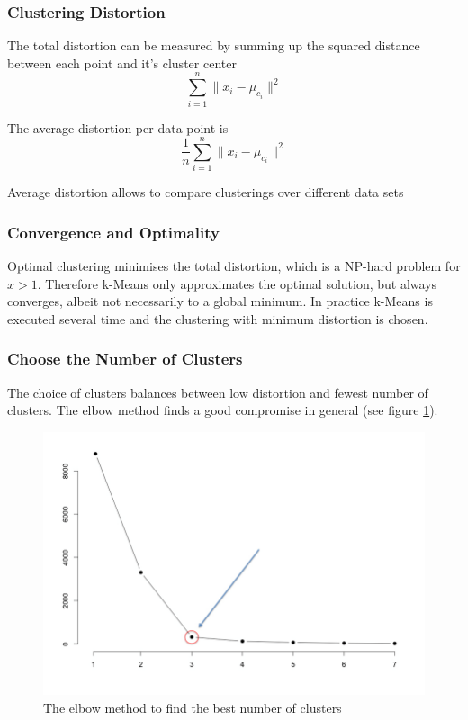 \documentclass[a4paper, 11pt]{article}
\begin{document}
\subsubsection{Clustering Distortion}

The total distortion can be measured by summing up the squared distance between each point and it's cluster center
\begin{equation}
	\sum_{i=1}^{n}\| x_i -\mu_{c_i} \|^2
\end{equation}

The average distortion per data point is
\begin{equation}
	\frac{1}{n}\sum_{i=1}^{n}\| x_i -\mu_{c_i} \|^2
\end{equation}

Average distortion allows to compare clusterings over different data sets

\subsubsection{Convergence and Optimality}

Optimal clustering minimises the total distortion, which is a NP-hard problem for $x>1$. Therefore k-Means only approximates the optimal solution, but always converges, albeit not necessarily to a global minimum. In practice k-Means is executed several time and the clustering with minimum distortion is chosen.

\subsubsection{Choose the Number of Clusters}

The choice of clusters balances between low distortion and fewest number of clusters. The elbow method finds a good compromise in general (see figure \ref{fig:elbowmethod}).

\begin{figure}[htb!]
	\centering
	\includegraphics[keepaspectratio, width=0.4\linewidth]{Pictures/elbow_method}
	\caption{The elbow method to find the best number of clusters}
	\label{fig:elbowmethod}
\end{figure}
\end{document}
